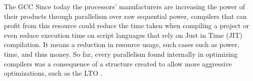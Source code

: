 \begin{section}{The GCC}
Since today the processors' manufacturers are increasing the power of their
products through parallelism over raw sequential power, compilers that can
profit from this resource could reduce the time taken when compiling a project
or even reduce execution time on script languages that rely on Just in Time
(JIT) compilation. It means a reduction in resource usage, such cases such as
power, time, and thus money. So far, every parallelism found internally in
optimizing compilers was a consequence of a structure created to allow more
aggressive optimizations, such as the LTO \citep{glek2010optimizing}.


\end{section}

